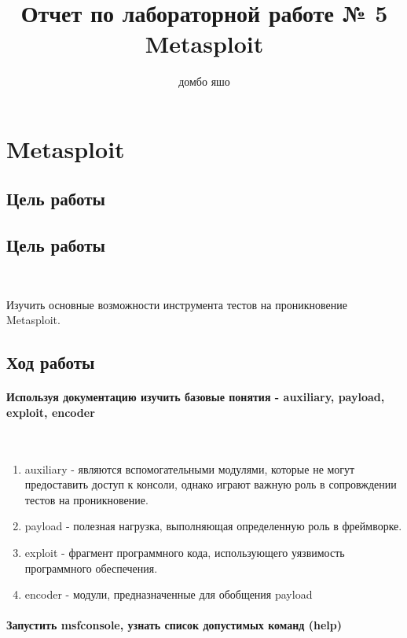 \documentclass[10pt,a4paper]{article}
\author{домбо яшо}
\title{Отчет по лабораторной работе № 5 Metasploit}
\begin{document}
\maketitle

\newpage

\section{Metasploit}

\subsection{Цель работы}

\subsection{Цель работы}
~

Изучить основные возможности инструмента тестов на проникновение Metasploit.
\subsection{Ход работы}

\paragraph{Используя документацию изучить базовые понятия - auxiliary, payload, exploit, encoder}
~

\begin{enumerate}
\item auxiliary - являются вспомогательными модулями, которые не могут предоставить доступ к консоли, однако играют важную роль в сопровждении тестов на проникновение.

\item payload - полезная нагрузка, выполняющая определенную роль в фреймворке.

\item exploit - фрагмент программного кода, использующего уязвимость программного обеспечения.

\item encoder - модули, предназначенные для обобщения payload
\end{enumerate}

\paragraph{Запустить msfconsole, узнать список допустимых команд (help)}
~
\end{document}
